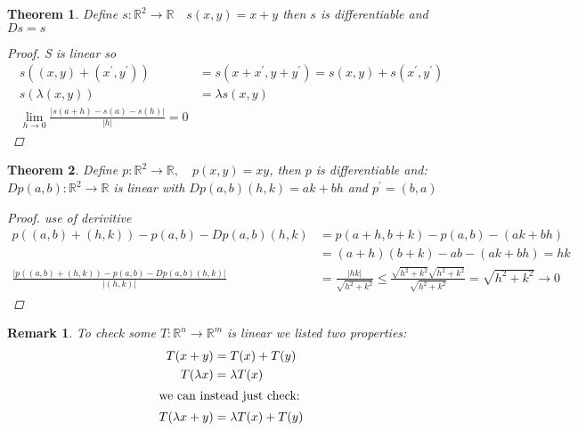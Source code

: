 \documentclass[12pt]{article}
\def\RR{\mathbb{R}}
\newtheorem{theorem}{Theorem}[section]
\newtheorem*{remark}{Remark}
\begin{document}
\begin{theorem}\label{s}
Define $s:\RR^2 \rightarrow \RR \quad s(x,y)=x + y$ then $s$ is differentiable  and $Ds = s$
\begin{proof}
S is linear so
\begin{align*}
s((x,y) + (x^{'},y^{'})) &=s(x+x^{'},y+y^{'})= s(x,y) + s(x^{'},y^{'})\\
s(\lambda(x,y)) &= \lambda s(x,y)\\
\lim_{h \to 0}\frac{|s(a+h) - s(a) -s(h)|}{|h|} = 0
\end{align*}
\end{proof}
\end{theorem}

\begin{theorem}\label{p}
Define $p:\RR^2 \rightarrow \RR, \quad p(x,y)=xy$, then $p$ is differentiable  and:\\
$Dp(a,b):\RR^2 \rightarrow \RR$ is linear with $Dp(a,b)(h,k) = ak + bh$ and $p^{'} = (b,a)$
\begin{proof}
use of derivitive
\begin{align*}
p((a,b)+(h,k)) - p(a,b) - Dp(a,b)(h,k) &= p(a+h,b+k) - p(a,b) - (ak + bh)\\
&=(a+h)(b+k) - ab - (ak + bh) = hk\\
\frac{|p((a,b)+(h,k)) - p(a,b) - Dp(a,b)(h,k)|}{|(h,k)|} &= \frac{|hk|}{\sqrt{h^2 + k^2}} \leq  \frac{\sqrt{h^2 + k^2}\sqrt{h^2 + k^2}}{\sqrt{h^2 + k^2}} = \sqrt{h^2 + k^2} \rightarrow 0
\end{align*}
\end{proof}
\end{theorem}

\begin{remark}
To check some $T:\RR^n \rightarrow \RR^m$ is linear we listed two properties:
\begin{align*}
T(x+y) &= T(x) +T(y)\\
T(\lambda x) &= \lambda T(x)\\
\shortintertext{we can instead just check:}
T( \lambda x + y) &= \lambda T(x) + T(y)
\end{align*}
\end{remark}
\end{document}
